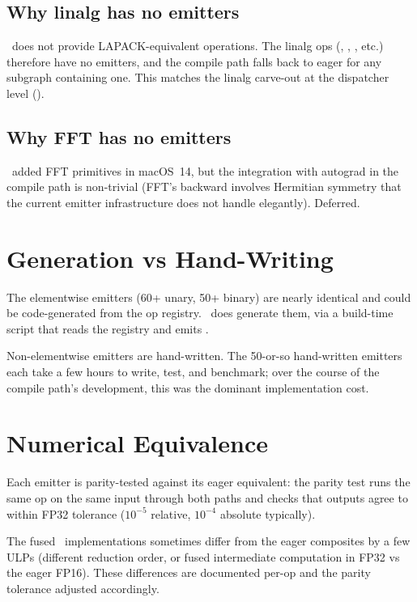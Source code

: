 \subsection{Why linalg has no emitters}
\label{ssec:op_emitters:linalg_gap}

\MPSGraph\ does not provide LAPACK-equivalent operations. The
linalg ops (, , , etc.)
therefore have no emitters, and the compile path falls back to
eager for any subgraph containing one. This matches the
linalg carve-out at the dispatcher level
().

\subsection{Why FFT has no emitters}
\label{ssec:op_emitters:fft_gap}

\MPSGraph\ added FFT primitives in macOS~14, but the integration
with autograd in the compile path is non-trivial (FFT's backward
involves Hermitian symmetry that the current emitter
infrastructure does not handle elegantly). Deferred.

\section{Generation vs Hand-Writing}
\label{sec:op_emitters:gen_vs_hand}

The elementwise emitters (60+ unary, 50+ binary) are nearly
identical and could be code-generated from the op registry.
\Lucid\ does generate them, via a build-time script
 that reads the registry and emits
.

Non-elementwise emitters are hand-written. The 50-or-so
hand-written emitters each take a few hours to write, test, and
benchmark; over the course of the compile path's development,
this was the dominant implementation cost.

\section{Numerical Equivalence}
\label{sec:op_emitters:numerical_equiv}

Each emitter is parity-tested against its eager equivalent: the
parity test runs the same op on the same input through both
paths and checks that outputs agree to within FP32 tolerance
($10^{-5}$ relative, $10^{-4}$ absolute typically).

The fused \MPSGraph\ implementations sometimes differ from the
eager composites by a few ULPs (different reduction order, or
fused intermediate computation in FP32 vs the eager FP16). These
differences are documented per-op and the parity tolerance
adjusted accordingly.


